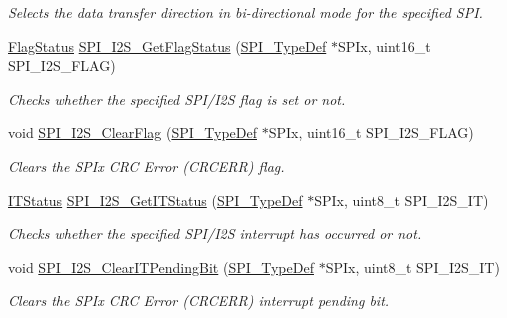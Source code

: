 \begin{DoxyCompactItemize}
\begin{DoxyCompactList}\small\item\em Selects the data transfer direction in bi-\/directional mode for the specified S\+PI. \end{DoxyCompactList}\item 
\hyperlink{group___exported__types_ga89136caac2e14c55151f527ac02daaff}{Flag\+Status} \hyperlink{group___s_p_i___private___functions_ga1bd785d129e09c5734a876c8f2767204}{S\+P\+I\+\_\+\+I2\+S\+\_\+\+Get\+Flag\+Status} (\hyperlink{struct_s_p_i___type_def}{S\+P\+I\+\_\+\+Type\+Def} $\ast$S\+P\+Ix, uint16\+\_\+t S\+P\+I\+\_\+\+I2\+S\+\_\+\+F\+L\+AG)
\begin{DoxyCompactList}\small\item\em Checks whether the specified S\+P\+I/\+I2S flag is set or not. \end{DoxyCompactList}\item 
void \hyperlink{group___s_p_i___private___functions_ga3aabd9e2437e213056c0ed9bdfa1a724}{S\+P\+I\+\_\+\+I2\+S\+\_\+\+Clear\+Flag} (\hyperlink{struct_s_p_i___type_def}{S\+P\+I\+\_\+\+Type\+Def} $\ast$S\+P\+Ix, uint16\+\_\+t S\+P\+I\+\_\+\+I2\+S\+\_\+\+F\+L\+AG)
\begin{DoxyCompactList}\small\item\em Clears the S\+P\+Ix C\+RC Error (C\+R\+C\+E\+RR) flag. \end{DoxyCompactList}\item 
\hyperlink{group___exported__types_gaacbd7ed539db0aacd973a0f6eca34074}{I\+T\+Status} \hyperlink{group___s_p_i___private___functions_ga72decbc1cd79f8fad92a2204beca6bc5}{S\+P\+I\+\_\+\+I2\+S\+\_\+\+Get\+I\+T\+Status} (\hyperlink{struct_s_p_i___type_def}{S\+P\+I\+\_\+\+Type\+Def} $\ast$S\+P\+Ix, uint8\+\_\+t S\+P\+I\+\_\+\+I2\+S\+\_\+\+IT)
\begin{DoxyCompactList}\small\item\em Checks whether the specified S\+P\+I/\+I2S interrupt has occurred or not. \end{DoxyCompactList}\item 
void \hyperlink{group___s_p_i___private___functions_ga35a524a49ff3d058137060f751e8749f}{S\+P\+I\+\_\+\+I2\+S\+\_\+\+Clear\+I\+T\+Pending\+Bit} (\hyperlink{struct_s_p_i___type_def}{S\+P\+I\+\_\+\+Type\+Def} $\ast$S\+P\+Ix, uint8\+\_\+t S\+P\+I\+\_\+\+I2\+S\+\_\+\+IT)
\begin{DoxyCompactList}\small\item\em Clears the S\+P\+Ix C\+RC Error (C\+R\+C\+E\+RR) interrupt pending bit. \end{DoxyCompactList}\end{DoxyCompactItemize}


